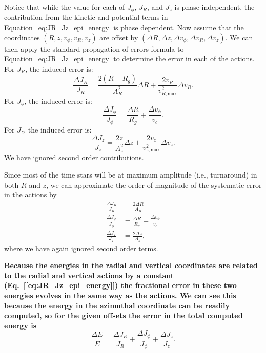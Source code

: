 \documentclass[twocolumn]{aastex62}
\newcommand{\beq}{\begin{equation}}
\newcommand{\eeq}{\end{equation}}
\begin{document}
Notice that while the value for each of $J_{\phi}$, $J_R$, and $J_z$ is phase
independent, the contribution from the kinetic and potential terms in
Equation~\eqref{eq:JR_Jz_epi_energy} is phase dependent. Now assume that the
coordinates $(R, z, v_{\phi}, v_R, v_z)$ are offset by $(\Delta R, \Delta z,
\Delta v_{\phi}, \Delta v_R, \Delta v_z)$. We can then apply the standard
propagation of errors formula to Equation~\eqref{eq:JR_Jz_epi_energy} to
determine the error in each of the actions. 
For $J_R$, the induced error is:
\beq\label{eq:induced_JR}
\frac{\Delta J_R}{J_R} = \frac{2(R-R_g)}{A_R^2}\Delta R
                         + \frac{2v_R}{v_{R,\text{max}}^2} \Delta v_R \text{.}
\eeq
For $J_{\phi}$, the induced error
is:
\beq\label{eq:induced_Jphi}
\frac{\Delta J_{\phi}}{J_{\phi}} = \frac{\Delta R}{R_g}
                                    + \frac{\Delta v_{\phi}}{v_c}\text{.}
\eeq
For $J_z$, the induced error is:
\beq\label{eq:induced_Jz}
\frac{\Delta J_z}{J_z} = \frac{2z}{A_z^2}\Delta z
                         + \frac{2v_z}{v_{z,\text{max}}^2} \Delta v_z \text{.}
\eeq
We have ignored second order contributions.

Since most of the time stars will be at maximum amplitude (i.e., turnaround)
in both $R$ and $z$, we can approximate the order of magnitude of the
systematic error in the actions by
\beq\label{eq:Ji_err_mosttime}
\begin{split}
\frac{\Delta J_{R}}{J_{R}} &= \frac{2\Delta R}{A_R} \\
\frac{\Delta J_{\phi}}{J_{\phi}} &= \frac{\Delta R}{R_g}
                                    + \frac{\Delta v_{\phi}}{v_c} \\
\frac{\Delta J_{z}}{J_{z}} &= \frac{2\Delta z}{A_z} \text{,}
\end{split}
\eeq
where we have again ignored second order terms.

\textbf{Because the energies in the radial and vertical coordinates are related to the
radial and vertical actions by a constant
    (Eq.~[\ref{eq:JR_Jz_epi_energy}])
the fractional error
     in
these two
energies
      evolves in the same way as the actions.  We can see this because the
 energy in the azimuthal coordinate can
be readily computed,
    so
for the given offsets the error
    in
the total computed energy is
\beq\label{eq:error_total_energy}
\frac{\Delta E}{E} = \frac{\Delta J_R}{J_R} + \frac{\Delta J_{\phi}}{J_{\phi}}
                     + \frac{\Delta J_z}{J_z}\text{.}
\eeq}
\end{document}
